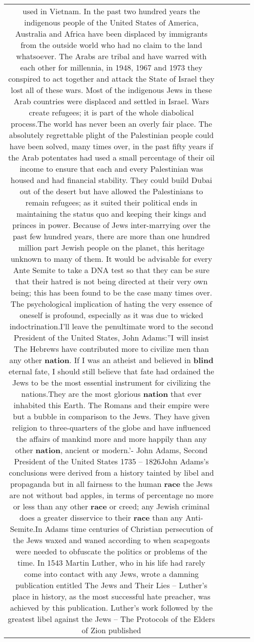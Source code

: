 \documentclass[11pt]{article}
\newlength\mylength
\begin{document}
\begin{center}
\begin{longtable}{|C{.65\mylength}|C{.30\mylength}|C{.12\mylength}|C{.12\mylength}|C{.12\mylength}|}
used in Vietnam. In the past two hundred years the indigenous people of the United States of America, Australia and Africa have been displaced by immigrants from the outside world who had no claim to the land whatsoever. The Arabs are tribal and have warred with each other for millennia, in 1948, 1967 and 1973 they conspired to act together and attack the State of Israel they lost all of these wars. Most of the indigenous Jews in these Arab countries were displaced and settled in Israel. Wars create refugees; it is part of the whole diabolical process.The world has never been an overly fair place. The absolutely regrettable plight of the Palestinian people could have been solved, many times over, in the past fifty years if the Arab potentates had used a small percentage of their oil income to ensure that each and every Palestinian was housed and had financial stability. They could build Dubai out of the desert but have allowed the Palestinians to remain refugees; as it suited their political ends in maintaining the status quo and keeping their kings and princes in power. Because of Jews inter-marrying over the past few hundred years, there are more than one hundred million part Jewish people on the planet, this heritage unknown to many of them. It would be advisable for every Ante Semite to take a DNA test so that they can be sure that their hatred is not being directed at their very own being; this has been found to be the case many times over. The psychological implication of hating the very essence of oneself is profound, especially as it was due to wicked indoctrination.I'll leave the penultimate word to the second President of the United States, John Adams:''I will insist The Hebrews have contributed more to civilize men than any other \textbf{nation}. If I was an atheist and believed in \textbf{blind} eternal fate, I should still believe that fate had ordained the Jews to be the most essential instrument for civilizing the nations.They are the most glorious \textbf{nation} that ever inhabited this Earth. The Romans and their empire were but a bubble in comparison to the Jews. They have given religion to three-quarters of the globe and have influenced the affairs of mankind more and more happily than any other \textbf{nation}, ancient or modern.'- John Adams, Second President of the United States   1735 – 1826John Adams's conclusions were derived from a history tainted by libel and propaganda but in all fairness to the human \textbf{race} the Jews are not without bad apples, in terms of percentage no more or less than any other \textbf{race} or creed; any Jewish criminal does a greater disservice to their \textbf{race} than any Anti-Semite.In Adams time centuries of Christian persecution of the Jews waxed and waned according to when scapegoats were needed to obfuscate the politics or problems of the time. In 1543 Martin Luther, who in his life had rarely come into contact with any Jews, wrote a damning publication entitled The Jews and Their Lies – Luther's place in history, as the most successful hate preacher, was achieved by this publication.  Luther's work followed by the greatest libel against the Jews – The Protocols of the Elders of Zion published 
\end{longtable}
\end{center}
\end{document}
